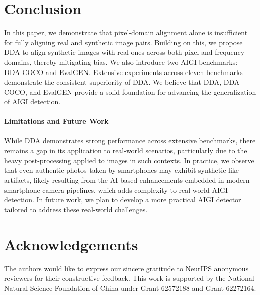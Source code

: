 \documentclass{article}
\begin{document}
\section{Conclusion}
\vspace{-10pt}
\label{sec:conclude}
In this paper, we demonstrate that pixel-domain alignment alone is insufficient for fully aligning real and synthetic image pairs. Building on this, we propose DDA to align synthetic images with real ones across both pixel and frequency domains, thereby mitigating bias. We also introduce two AIGI benchmarks: DDA-COCO and EvalGEN. Extensive experiments across eleven benchmarks demonstrate the consistent superiority of DDA. We believe that DDA, DDA-COCO, and EvalGEN provide a solid foundation for advancing the generalization of AIGI detection.

\paragraph{Limitations and Future Work}
While DDA demonstrates strong performance across extensive benchmarks, there remains a gap in its application to real-world scenarios, particularly due to the heavy post-processing applied to images in such contexts. In practice, we observe that even authentic photos taken by smartphones may exhibit synthetic-like artifacts, likely resulting from the AI-based enhancements embedded in modern smartphone camera pipelines, which adds complexity to real-world AIGI detection. In future work, we plan to develop a more practical AIGI detector tailored to address these real-world challenges.

\vspace{-10pt}
\section{Acknowledgements}
\label{sec:ack}
\vspace{-5pt}
The authors would like to express our sincere gratitude to NeurIPS anonymous reviewers for their constructive feedback.
This work is supported by the National Natural Science Foundation of China under Grant 62572188 and Grant 62272164.





\end{document}
